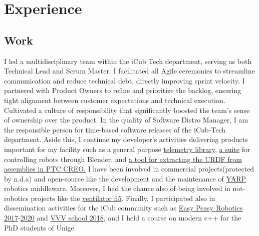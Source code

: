 \documentclass[10pt,a4paper]{moderncv}
\begin{document}
\section{Experience}
\subsection{Work}
{
I led a multidisciplinary team within the iCub Tech department, serving as both Technical Lead and Scrum Master. I facilitated all Agile ceremonies to streamline communication and reduce technical debt, directly improving sprint velocity. I partnered with Product Owners to refine and prioritize the backlog, ensuring tight alignment between customer expectations and technical execution. Cultivated a culture of responsibility that significantly boosted the team’s sense of ownership over the product.}
{
In the quality of Software Distro Manager, I am the responsible person for time-based software releases of the iCub-Tech department.
Aside this, I continue my developer's activities delivering products important for my facility such as a general purpose \href{https://github.com/robotology/yarp-telemetry}{telemetry library}, \href{https://github.com/robotology/blender-robotics-utils}{a suite} for controlling robots through Blender, and \href{https://github.com/icub-tech-iit/creo2urdf}{a tool for extracting the URDF from assemblies in PTC CREO.}}
{I have been involved in commercial projects(protected by n.d.a) and open-source like the development and the maintenance of \href{https://github.com/robotology/yarp}{YARP} robotics middleware.
Moreover, I had the chance also of being involved in not-robotics projects like the \href{https://github.com/icub-tech-iit/ventilator-fi5}{ventilator fi5}.
Finally, I participated also in dissemination activities for the iCub community such as \href{https://easy-peasy-robotics.github.io/editions/mfr17/course-program.html}{Easy Peasy Robotics 2017}-\href{https://easy-peasy-robotics.github.io/editions/web20/course-program.html}{2020}
and \href{http://www.icub.org/school/2018}{VVV school 2018}, and I held a course on modern c++ for the PhD students of Unige.}
\end{document}
